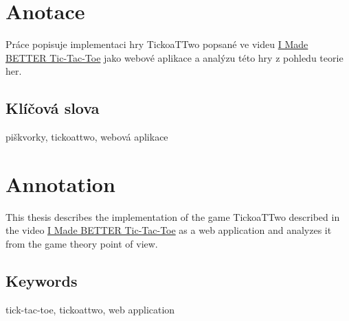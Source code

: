 \documentclass{socthesis}
\author{Marian Šámal}
\begin{document}
\maketitle






\pagestyle{empty}

\section*{Anotace}
Práce popisuje implementaci hry TickoaTTwo popsané ve videu
\href{https://www.youtube.com/watch?v=ePxrVU4M9uA}{I Made BETTER Tic-Tac-Toe}
jako webové aplikace a analýzu této hry z pohledu teorie her.

\subsection*{Klíčová slova}
piškvorky, tickoattwo, webová aplikace

\vspace{20mm}

\section*{Annotation}
This thesis describes the implementation of the game TickoaTTwo described in the video
\href{https://www.youtube.com/watch?v=ePxrVU4M9uA}{I Made BETTER Tic-Tac-Toe}
as a web application and analyzes it from the game theory point of view.

\subsection*{Keywords}
tick-tac-toe, tickoattwo, web application


\newpage
\pagestyle{plain}
\tableofcontents %

\setcounter{figure}{0}
\setcounter{table}{0}
\newpage
{}
\setcounter{page}{9}  %











\newpage
\printbibliography[title=Literatura]
\nocite{*}
\renewcommand{\baselinestretch}{1.5}

\lstlistoflistings
{}


\listoffigures
{}
\end{document}
